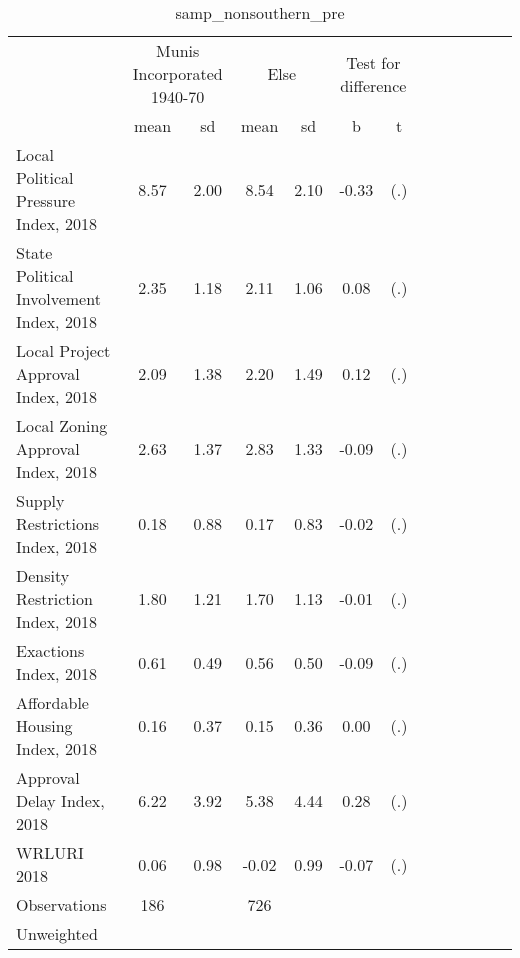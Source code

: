 \begin{table}[htbp]\centering
\def\sym#1{\ifmmode^{#1}\else\(^{#1}\)\fi}
\caption{samp\_nonsouthern\_pre \label{tab1}}
\begin{tabular}{l*{3}{cccc}}
\toprule
                    &\multicolumn{2}{c}{Munis Incorporated 1940-70}&\multicolumn{2}{c}{Else} &\multicolumn{2}{c}{Test for difference}\\
                    &        mean&          sd&        mean&          sd&           b         &           t\\
\midrule
Local Political Pressure Index, 2018&        8.57&        2.00&        8.54&        2.10&       -0.33         &         (.)\\
State Political Involvement Index, 2018&        2.35&        1.18&        2.11&        1.06&        0.08         &         (.)\\
Local Project Approval Index, 2018&        2.09&        1.38&        2.20&        1.49&        0.12         &         (.)\\
Local Zoning Approval Index, 2018&        2.63&        1.37&        2.83&        1.33&       -0.09         &         (.)\\
Supply Restrictions Index, 2018&        0.18&        0.88&        0.17&        0.83&       -0.02         &         (.)\\
Density Restriction Index, 2018&        1.80&        1.21&        1.70&        1.13&       -0.01         &         (.)\\
Exactions Index, 2018&        0.61&        0.49&        0.56&        0.50&       -0.09         &         (.)\\
Affordable Housing Index, 2018&        0.16&        0.37&        0.15&        0.36&        0.00         &         (.)\\
Approval Delay Index, 2018&        6.22&        3.92&        5.38&        4.44&        0.28         &         (.)\\
WRLURI 2018         &        0.06&        0.98&       -0.02&        0.99&       -0.07         &         (.)\\
\midrule
Observations        &         186&            &         726&            &                     &            \\
\bottomrule
\multicolumn{7}{l}{\footnotesize Unweighted}\\
\end{tabular}
\end{table}
